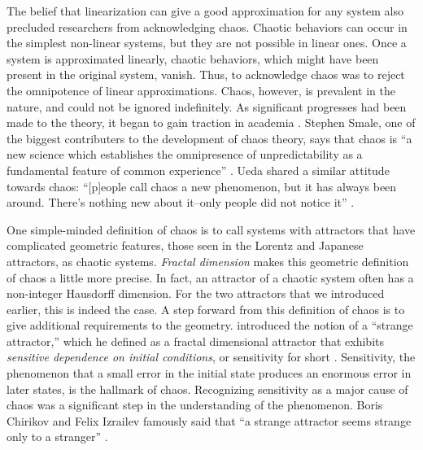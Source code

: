 \documentclass[10pt,twoside,draft]{book}
\begin{document}
The belief that linearization can give a good approximation for any system also precluded researchers from acknowledging chaos.
Chaotic behaviors can occur in the simplest non-linear systems, but they are not possible in linear ones.
Once a system is approximated linearly, chaotic behaviors, which might have been present in the original system, vanish.
Thus, to acknowledge chaos was to reject the omnipotence of linear approximations.
Chaos, however, is prevalent in the nature, and could not be ignored indefinitely.
As significant progresses had been made to the theory, it began to gain traction in academia \citep{gleick}.
Stephen Smale, one of the biggest contributers to the development of chaos theory, says that chaos is ``a new science which establishes the omnipresence of unpredictability as a fundamental feature of common experience'' \citep[p.16]{ueda-abraham}.
Ueda shared a similar attitude towards chaos: ``[p]eople call chaos a new phenomenon, but it has always been around.
There's nothing new about it--only people did not notice it''
\citep[p.27]{ueda-abraham}.

One simple-minded definition of chaos is to call systems with attractors that have complicated geometric features, those seen in the Lorentz and Japanese attractors, as chaotic systems.
\textit{Fractal dimension} makes this geometric definition of chaos a little more precise.
In fact, an attractor of a chaotic system often has a non-integer Hausdorff dimension. 
For the two attractors that we introduced earlier, this is indeed the case.
A step forward from this definition of chaos is to give additional requirements to the geometry.
\citet{ruelle} introduced the notion of a ``strange attractor,'' which he defined as a fractal dimensional attractor that exhibits \textit{sensitive dependence on initial conditions}, or sensitivity for short \citep[p.11]{ott1994}.
Sensitivity, the phenomenon that a small error in the initial state produces an enormous error in later states, is the hallmark of chaos.
Recognizing sensitivity as a major cause of chaos was a significant step in the understanding of the phenomenon.
Boris Chirikov and Felix Izrailev famously said that ``a strange attractor seems strange only to a stranger'' \citep{lorentzbook}.
\end{document}
